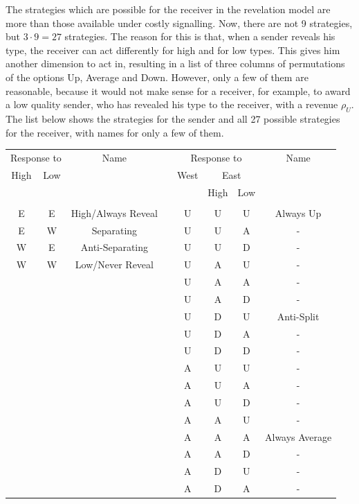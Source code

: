 \documentclass[a4paper,10pt]{article}
\numberwithin{equation}{section}
\begin{document}
The strategies which are possible for the receiver in the revelation model are more than those available under costly signalling. Now, there are not 9 strategies, but $3\cdot9=27$ strategies. The reason for this is that, when a sender reveals his type, the receiver can act differently for high and for low types. This gives him another dimension to act in, resulting in a list of three columns of permutations of the options Up, Average and Down. However, only a few of them are reasonable, because it would not make sense for a receiver, for example, to award a low quality sender, who has revealed his type to the receiver, with a revenue $\rho_U$. The list below shows the strategies for the sender and all 27 possible strategies for the receiver, with names for only a few of them.

\begin{table}[h]
\begin{center}
\begin{tabular}{c|c|ccc|c|c|c}
\multicolumn{2}{c|}{Response to}&Name& \hspace{1cm} &\multicolumn{3}{c|}{Response to}&Name\\
High&Low&&&West&\multicolumn{2}{c|}{East}&\\
&&&&&High&Low&\\
\cline{1-3}
\cline{5-8}
&&&&&&\\[-.3cm]
E&E&High/Always Reveal&&U&U&U&Always Up\\
E&W&Separating&&U&U&A&-\\
W&E&Anti-Separating&&U&U&D&-\\
W&W&Low/Never Reveal&&U&A&U&-\\
\multicolumn{3}{c}{}&&U&A&A&-\\
\multicolumn{3}{c}{}&&U&A&D&-\\
\multicolumn{3}{c}{}&&U&D&U&Anti-Split\\
\multicolumn{3}{c}{}&&U&D&A&-\\
\multicolumn{3}{c}{}&&U&D&D&-\\
\multicolumn{3}{c}{}&&A&U&U&-\\
\multicolumn{3}{c}{}&&A&U&A&-\\
\multicolumn{3}{c}{}&&A&U&D&-\\
\multicolumn{3}{c}{}&&A&A&U&-\\
\multicolumn{3}{c}{}&&A&A&A&Always Average\\
\multicolumn{3}{c}{}&&A&A&D&-\\
\multicolumn{3}{c}{}&&A&D&U&-\\
\multicolumn{3}{c}{}&&A&D&A&-\\

\end{tabular}
\end{center}
\end{table}
\end{document}
